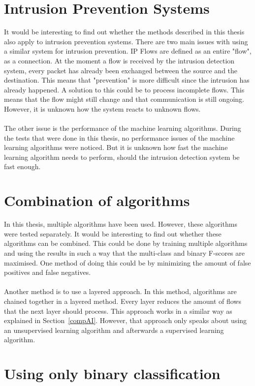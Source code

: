 \section{Intrusion Prevention Systems}
It would be interesting to find out whether the methods described in this thesis also apply to intrusion prevention systems. There are two main issues with using a similar system for intrusion prevention. IP Flows are defined as an entire "flow", as a connection. At the moment a flow is received by the intrusion detection system, every packet has already been exchanged between the source and the destination. This means that "prevention" is more difficult since the intrusion has already happened. A solution to this could be to process incomplete flows. This means that the flow might still change and that communication is still ongoing. However, it is unknown how the system reacts to unknown flows. \\
\\
The other issue is the performance of the machine learning algorithms. During the tests that were done in this thesis, no performance issues of the machine learning algorithms were noticed. But it is unknown how fast the machine learning algorithm needs to perform, should the intrusion detection system be fast enough.

\section{Combination of algorithms}
In this thesis, multiple algorithms have been used. However, these algorithms were tested separately. It would be interesting to find out whether these algorithms can be combined. This could be done by training multiple algorithms and using the results in such a way that the multi-class and binary F-scores are maximised. One method of doing this could be by minimizing the amount of false positives and false negatives. \\
\\
Another method is to use a layered approach. In this method, algorithms are chained together in a layered method. Every layer reduces the amount of flows that the next layer should process. This approach works in a similar way as explained in Section~\ref{compAI}. However, that approach only speaks about using an unsupervised learning algorithm and afterwards a supervised learning algorithm. 

\section{Using only binary classification}

